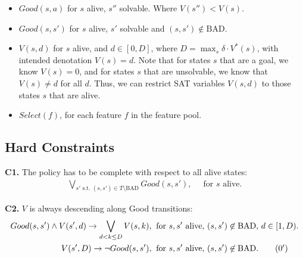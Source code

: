 \documentclass[a4paper]{article}
\newcommand{\smallpar}[1]{{\vspace{10pt}\noindent \bf #1.}}
\newcommand{\badtx}{\ensuremath{\mathrm{BAD}}}
\begin{document}
\begin{itemize}
 \item $Good(s, a)$ for $s$ alive, $s''$ solvable. Where $V(s'') < V(s)$.

 \item $Good(s, s')$ for $s$ alive, $s'$ solvable and $(s, s') \not\in \badtx$.

 \item $V(s, d)$ for $s$ alive, and $d \in [0, D]$, where $D = \max_{s} \delta \cdot V^*(s)$,
 with intended denotation $V(s)=d$.
 Note that for states $s$ that are a goal, we know $V(s)=0$,
 and for states $s$ that are unsolvable, we know that $V(s) \neq d$ for all $d$.
 Thus, we can restrict SAT variables $V(s, d)$ to those states $s$ that are alive.

 \item $Select(f)$, for each feature $f$ in the feature pool.
\end{itemize}



\subsection{Hard Constraints}

\smallpar{C1}
The policy has to be complete with respect to all alive states:
\begin{align}
\bigvee_{s' \text{ s.t. } (s, s') \in T \setminus \badtx} Good(s, s'),&\;\; \text{for $s$ alive.}
\end{align}


\smallpar{C2} $V$ is always descending along Good transitions:
\begin{align}
 Good(s, s') \land V(s', d) \rightarrow \bigvee_{d < k \leq D} V(s, k),&\;\; \text{for $s, s'$ alive, $(s, s') \not\in \badtx$, $d \in [1, D)$.} \\
 V(s', D) \rightarrow \neg Good(s, s'),&\;\; \text{for $s, s'$ alive, $(s, s') \not\in \badtx$.} \tag{\theequation${}^\prime$}
\end{align}
\end{document}
